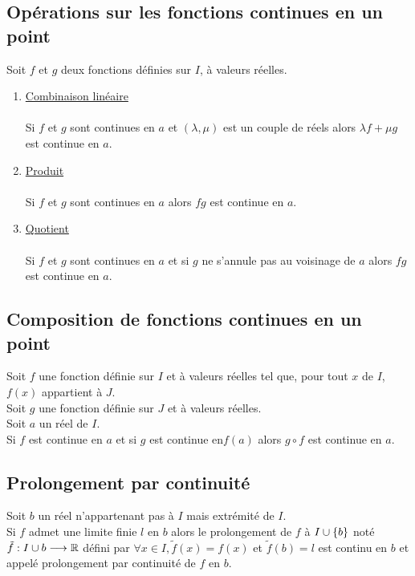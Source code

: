 \subsection{Opérations sur les fonctions continues en un point}
\begin{defprop}
    Soit \(f\) et \(g\) deux fonctions définies sur \(I\), à valeurs réelles.
    \begin{enumerate}
        \item \underline{Combinaison linéaire}\\~\\
            Si \(f\) et \(g\) sont continues en \(a\) et \((\lambda, \mu)\) est un couple de réels alors \(\lambda f + \mu g\) est continue en \(a\).
        \item \underline{Produit}\\~\\
            Si \(f\) et \(g\) sont continues en \(a\) alors \(f g\) est continue en \(a\).
        \item \underline{Quotient}\\~\\
            Si \(f\) et \(g\) sont continues en \(a\) et si \(g\) ne s’annule pas au voisinage de \(a\) alors \(f g\) est continue en \(a\).
    \end{enumerate}
\end{defprop}

\subsection{Composition de fonctions continues en un point}
    \begin{defprop}
        Soit \(f\) une fonction définie sur \(I\) et à valeurs réelles tel que, pour tout \(x\) de \(I\), \(f (x)\) appartient à \(J\).\\
        Soit \(g\) une fonction définie sur \(J\) et à valeurs réelles.\\
        Soit \(a\) un réel de \(I\).\\
        Si \(f\) est continue en \(a\) et si \(g\) est continue en\( f (a)\) alors \(g \circ f\) est continue en \(a\).\\
\end{defprop}


\subsection{Prolongement par continuité} 
\begin{defprop} 
    Soit \(b\) un réel n’appartenant pas à \(I\) mais extrémité de \(I\). \\
    Si \(f\) admet une limite finie \(l\) en \(b\) alors le prolongement de \(f\) à \(I \cup \left\lbrace b\right\rbrace\) noté \(\tilde{f} : I \cup {b} \longrightarrow \mathbb{R}\) défini par \(\forall x \in  I, \tilde{f} (x) = f (x)\) et \(\tilde{f} (b) = l \) est continu en \(b\) et appelé prolongement par continuité de \(f\) en \(b\).
\end{defprop}

